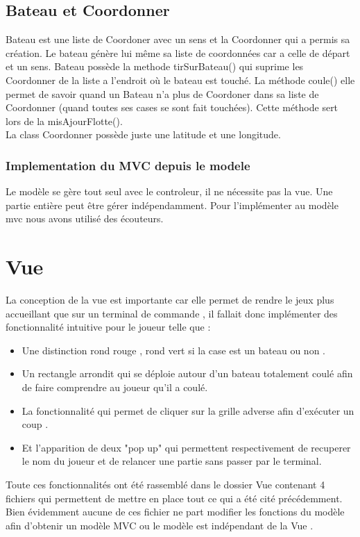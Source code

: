 \documentclass[a4paper,12pt]{article} %
\begin{document}
\subsection{Bateau et Coordonner}
Bateau est une liste de Coordoner avec un sens et la Coordonner qui a permis sa création. Le bateau génère lui même sa liste de coordonnées car a celle de départ et un sens. Bateau possède la methode tirSurBateau() qui suprime les Coordonner de la liste a l'endroit où le bateau est touché. La méthode coule() elle permet de savoir quand un Bateau n'a plus de Coordoner dans sa liste de Coordonner (quand toutes ses cases se sont fait touchées). Cette méthode sert lors de la misAjourFlotte().\\
La class Coordonner possède juste une latitude et une longitude.   
\subsubsection{Implementation du MVC depuis le modele}
Le modèle se gère tout seul avec le controleur, il ne nécessite pas la vue. Une partie entière peut être gérer indépendamment. Pour l'implémenter au modèle mvc nous avons utilisé des écouteurs.


\section{Vue}
La conception de la vue est importante car elle permet de rendre le jeux plus accueillant que sur un terminal de commande , il fallait donc implémenter des fonctionnalité intuitive pour le joueur telle que :
\begin{itemize}
\item Une distinction rond rouge , rond vert si la case est un bateau ou non .
\item Un rectangle arrondit qui se déploie autour d'un bateau totalement coulé afin de faire comprendre au joueur qu'il a coulé.
\item La fonctionnalité qui permet de cliquer sur la grille adverse afin d’exécuter un coup .
\item Et l'apparition de deux "pop up" qui permettent respectivement de recuperer le nom du joueur et de  relancer une partie sans passer par le terminal.
\end{itemize}
Toute ces fonctionnalités ont été rassemblé dans le dossier Vue contenant 4 fichiers qui permettent de mettre en place tout ce qui a été cité précédemment.
Bien évidemment aucune de ces fichier ne part modifier les fonctions du modèle afin d'obtenir un modèle MVC ou le modèle est indépendant de la Vue .
\end{document}
